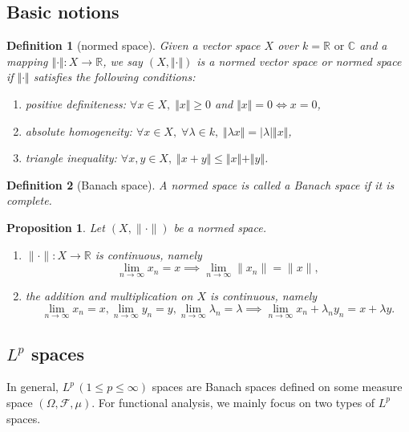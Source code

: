 \documentclass{report}
\newtheorem{definition}{Definition}[section]
\newtheorem{proposition}{Proposition}[section]
\theoremstyle{nonumberplain}
\begin{document}
\subsection{Basic notions}
\begin{definition}[normed space]
	Given a vector space $X$ over $k=\mathbb{R}\text{ or }\mathbb{C}$ and a mapping $\Vert\cdot\Vert : X\to\mathbb{R}$, we say
	$\left(X, \Vert\cdot\Vert\right)$ is a \emph{normed vector space} or \emph{normed space} if $\Vert\cdot\Vert$ satisfies the following conditions:
	\begin{enumerate}
		\item positive definiteness: $\forall x\in X,\;\Vert x\Vert\ge 0$ and $\Vert x\Vert=0\iff x=0$,
		\item absolute homogeneity: $\forall x\in X,\;\forall\lambda\in k,\;\Vert \lambda x\Vert=|\lambda| \Vert  x\Vert$,
		\item triangle inequality: $\forall x, y\in X,\;\Vert x+ y\Vert\le\Vert x\Vert+\Vert y\Vert$.
	\end{enumerate}	
\end{definition}

\begin{definition}[Banach space]
	A normed space is called a \emph{Banach space} if it is complete.
\end{definition}

\begin{proposition}
	Let $(X,\|\cdot\|)$ be a normed space.
	\begin{enumerate}
		\item $\|\cdot\|:X\to\mathbb{R}$ is continuous, namely
		\[\lim_{n\to\infty}x_n=x\implies\lim_{n\to\infty}\|x_n\|=\|x\|,\]
		\item the addition and multiplication on $X$ is continuous, namely
		\[
			\lim_{n\to\infty}x_n=x,\lim_{n\to\infty}y_n=y,\lim_{n\to\infty}\lambda_n=\lambda\implies\lim_{n\to\infty}x_n+\lambda_ny_n=x+\lambda y.
		\]
	\end{enumerate}	
\end{proposition}

\subsection{$L^p$ spaces}
In general, $L^p\,(1\le p\le\infty)$ spaces are Banach spaces defined on some measure space $(\Omega, \mathcal{F}, \mu)$. For functional analysis, we mainly focus on two types of $L^p$ spaces. 
\end{document}

